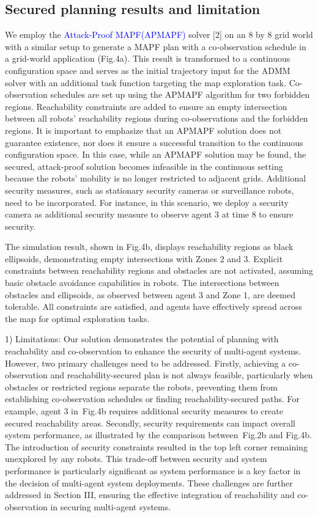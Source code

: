 \documentclass{article}
\newcommand{\new}[1]{\textcolor{blue}{#1}}
\newcommand{\news}{\color{blue}}
\begin{document}
\subsection{Secured planning results and limitation}\label{sec:ADMM-simulation}
We employ the \new{Attack-Proof MAPF(APMAPF)} solver [2] on an 8 by 8 grid world with a similar setup to generate a MAPF plan with a co-observation schedule in a grid-world application (Fig.4a). This result is transformed to a continuous configuration space and serves as the initial trajectory input for the ADMM solver with an additional task function targeting the map exploration task. Co-observation schedules are set up using the APMAPF algorithm for two forbidden regions. Reachability constraints are added to ensure an empty intersection between all robots' reachability regions during co-observations and the forbidden regions. {\news It is important to emphasize that an APMAPF solution does not guarantee existence, nor does it ensure a successful transition to the continuous configuration space. In this case, while an APMAPF solution may be found, the secured, attack-proof solution becomes infeasible in the continuous setting because the robots' mobility is no longer restricted to adjacent grids. Additional security measures, such as stationary security cameras or surveillance robots, need to be incorporated. For instance, in this scenario, we deploy a security camera as additional security measure to observe agent 3 at time $8$ to ensure security.}

The simulation result, shown in Fig.4b, displays reachability regions as black ellipsoids, demonstrating empty intersections with Zones 2 and 3. Explicit constraints between reachability regions and obstacles are not activated, assuming basic obstacle avoidance capabilities in robots. The intersections between obstacles and ellipsoids, as observed between agent 3 and Zone 1, are deemed tolerable. All constraints are satisfied, and agents have effectively spread across the map for optimal exploration tasks.

1) Limitations:
Our solution demonstrates the potential of planning with reachability and co-observation to enhance the security of multi-agent systems. {\news However, two primary challenges need to be addressed. Firstly, achieving a co-observation and reachability-secured plan is not always feasible, particularly when obstacles or restricted regions separate the robots, preventing them from establishing co-observation schedules or finding reachability-secured paths. For example, agent 3 in~Fig.4b requires additional security measures to create secured reachability areas. Secondly, security requirements can impact overall system performance, as illustrated by the comparison between~Fig.2b and Fig.4b. The introduction of security constraints resulted in the top left corner remaining unexplored by any robots. This trade-off between security and system performance is particularly significant as system performance is a key factor in the decision of multi-agent system deployments. These challenges are further addressed in Section III, ensuring the effective integration of reachability and co-observation in securing multi-agent systems.}
\end{document}

